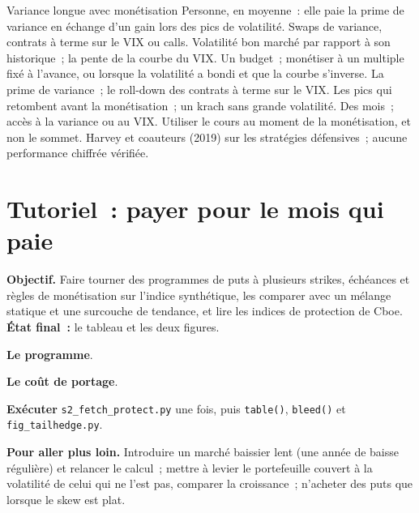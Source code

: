 \begin{strategyfile}{Variance longue avec monétisation}\label{strat:s2:tail-hedging-and-long-volatility:variance}
 Personne, en moyenne~: elle paie la prime de variance en échange d'un gain lors des pics de volatilité.
 Swaps de variance, contrats à terme sur le VIX ou calls.
 Volatilité bon marché par rapport à son historique~; la pente de la courbe du VIX.
 Un budget~; monétiser à un multiple fixé à l'avance, ou lorsque la volatilité a bondi et que la courbe s'inverse.
 La prime de variance~; le roll-down des contrats à terme sur le VIX.
 Les pics qui retombent avant la monétisation~; un krach sans grande volatilité.
 Des mois~; accès à la variance ou au VIX.
 Utiliser le cours au moment de la monétisation, et non le sommet.
 Harvey et coauteurs (2019) sur les stratégies défensives~; aucune performance chiffrée vérifiée.
\end{strategyfile}

\section{Tutoriel~: payer pour le mois qui paie}\label{tut:s2:tail-hedging-and-long-volatility:tut}

\begin{tutorial}
\textbf{Objectif.} Faire tourner des programmes de puts à plusieurs strikes, échéances et règles de monétisation sur l'indice synthétique, les comparer avec un mélange statique et une
surcouche de tendance, et lire les indices de protection de Cboe. \textbf{État final~:} le tableau et les deux figures.
\begin{tutsteps}
\item \textbf{Le programme}.
\label{lst:s2:tail-hedging-and-long-volatility:programme}
\item \textbf{Le coût de portage}.
\label{lst:s2:tail-hedging-and-long-volatility:bleed}
\item \textbf{Exécuter} \texttt{s2\_fetch\_protect.py} une fois, puis \texttt{table()}, \texttt{bleed()} et \texttt{fig\_tailhedge.py}.
\end{tutsteps}
\textbf{Pour aller plus loin.} Introduire un marché baissier lent (une année de baisse régulière) et relancer le calcul~; mettre à levier le portefeuille couvert à la volatilité de celui qui ne l'est pas,
comparer la croissance~; n'acheter des puts que lorsque le skew est plat.
\end{tutorial}

